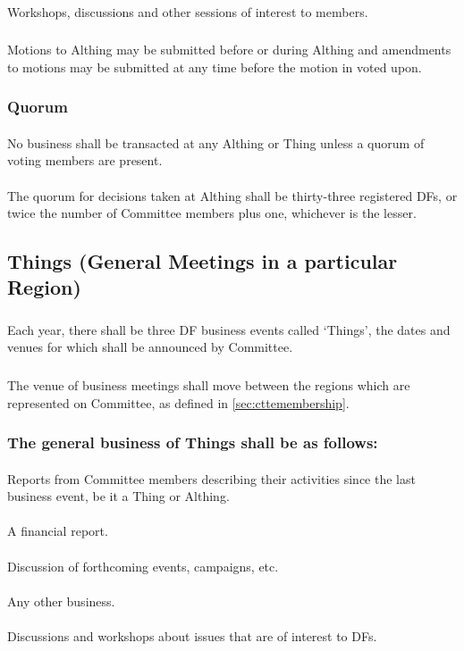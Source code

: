 \documentclass[a4paper, 12pt]{report}
\begin{document}
\paragraph{}
Workshops, discussions and other sessions of interest to members.
\subsubsection{}
Motions to Althing may be submitted before or during Althing and amendments to motions may be submitted at any time before the motion in voted upon.
\subsubsection{Quorum}
\paragraph{} No business shall be transacted at any Althing or Thing unless a quorum of voting
members are present.
\paragraph{} The quorum for decisions taken at Althing shall be thirty-three registered DFs, or twice the number of Committee members plus one, whichever is the lesser.

\subsection{Things (General Meetings in a particular Region)}
\subsubsection{}
Each year, there shall be three DF business events called `Things', the dates and venues for which shall be announced by Committee.
\subsubsection{}
The venue of business meetings shall move between the regions which are represented on Committee, as defined in \ref{sec:cttemembership}.
\subsubsection{The general business of Things shall be as follows:}
\paragraph{}
Reports from Committee members describing their activities since the last business event, be it a Thing or Althing.
\paragraph{}
A financial report.
\paragraph{}
Discussion of forthcoming events, campaigns, etc. 
\paragraph{}
Any other business.
\paragraph{}
Discussions and workshops about issues that are of interest to DFs. 
\end{document}
